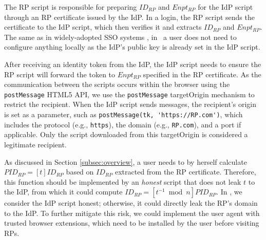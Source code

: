 
The RP script is responsible for preparing $ID_{RP}$ and $Enpt_{RP}$ for the IdP script through an RP certificate issued by the IdP. %
In a login, the RP script sends the certificate to the IdP script, which then verifies it and extracts $ID_{RP}$ and $Enpt_{RP}$.
The same as in widely-adopted SSO systems \cite{OpenIDConnect, rfc6749, SAML, SAMLIdentifier}, in \usso\ a user does not need to configure anything locally as the IdP's public key is already set in the IdP script.

After receiving an identity token from the IdP, the IdP script needs to ensure the RP script will forward the token to $Enpt_{RP}$ %
specified in the RP certificate.
As the communication between the scripts occurs within the browser using the \verb+postMessage+ HTML5 API, %
we use the \verb+postMessage+ targetOrigin mechanism \cite{postm-targeto} to restrict the recipient. %
 When the IdP script sends messages, the recipient's origin is set as a parameter, such as \verb+postMessage(tk, 'https://RP.com')+, which includes the protocol (e.g., \verb+https+), the domain (e.g., \verb+RP.com+), and a port if applicable.
Only the script downloaded from this targetOrigin is considered a legitimate recipient.


\newc
As discussed in Section \ref{subsec:overview}, a user needs to by herself calculate $PID_{RP} = [t]ID_{RP}$ based on $ID_{RP}$ extracted from the RP certificate. Therefore, this function should be implemented by an \emph{honest} script that does not leak $t$ to the IdP, from which it could compute $ID_{RP} = [t^{-1}\bmod n]PID_{RP}$. In \usso, we consider the IdP script honest; otherwise, it could directly leak the RP's domain to the IdP. To further mitigate this risk, we could implement the user agent with trusted browser extensions, which need to be installed by the user before visiting RPs.
\oldc

